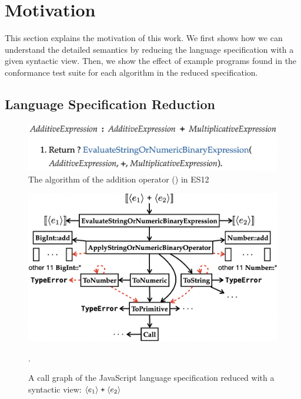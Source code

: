 \section{Motivation}\label{sec:motivation}

This section explains the motivation of this work.  We first shows how we can
understand the detailed semantics by reducing the language specification with a
given syntactic view.  Then, we show the effect of example programs found in the
conformance test suite for each algorithm in the reduced specification.


\subsection{Language Specification Reduction}\label{sec:reduce-spec}

\begin{figure}
  \centering
  \includegraphics[width=\columnwidth]{img/add-eval.png}
  \caption{The  algorithm of the addition operator
  (\code{+}) in ES12}
  \label{fig:add-eval}
\end{figure}

\begin{figure}
  \centering
  \includegraphics[width=\columnwidth]{img/add-basic.png}
  \caption{A call graph of the JavaScript language specification reduced with a
  syntactic view: $\langle e_1 \rangle \; \texttt{+} \; \langle e_2 \rangle$}
  \label{fig:add-basic}.
\end{figure}

